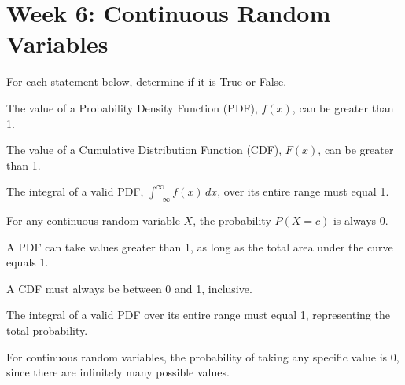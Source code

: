\documentclass[a4paper, 10pt]{article}
\begin{document}
\subject[2110205 - Statistics for Computer Engineering]


\section{Week 6: Continuous Random Variables}



\begin{problem}
For each statement below, determine if it is True or False.
\begin{subproblems}
    \item The value of a Probability Density Function (PDF), \( f(x) \), can be greater than 1.
    \item The value of a Cumulative Distribution Function (CDF), \( F(x) \), can be greater than 1.
    \item The integral of a valid PDF, \( \int_{-\infty}^{\infty} f(x)\,dx \), over its entire range must equal 1.
    \item For any continuous random variable \( X \), the probability \( P(X = c) \) is always 0.
\end{subproblems}
\end{problem}

\begin{solution}
\begin{subproblems}
    \item {} A PDF can take values greater than 1, as long as the total area under the curve equals 1.
    \item {} A CDF must always be between 0 and 1, inclusive.
    \item {} The integral of a valid PDF over its entire range must equal 1, representing the total probability.
    \item {} For continuous random variables, the probability of taking any specific value is 0, since there are infinitely many possible values.
\end{subproblems}
\end{solution}
\end{document}
